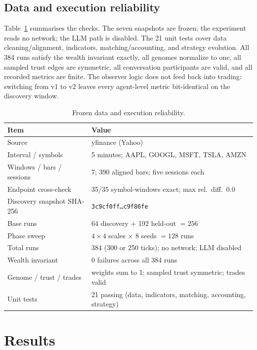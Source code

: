\documentclass[11pt]{article}
\begin{document}
\subsection{Data and execution reliability}

Table~\ref{tab:reliability} summarises the checks. The seven snapshots are
frozen; the experiment reads no network; the LLM path is disabled. The 21 unit
tests cover data cleaning/alignment, indicators, matching/accounting, and
strategy evolution. All 384 runs satisfy the wealth invariant exactly, all
genomes normalize to one, all sampled trust edges are symmetric, all conversation
participants are valid, and all recorded metrics are finite. The observer logic
does not feed back into trading: switching from v1 to v2 leaves every agent-level
metric bit-identical on the discovery window.

\begin{table}[t]
  \centering
  \small
  \caption{Frozen data and execution reliability.}
  \label{tab:reliability}
  \begin{tabular}{ll}
    \toprule
    Item & Value\\
    \midrule
    Source & yfinance (Yahoo)\\
    Interval / symbols & 5 minutes; AAPL, GOOGL, MSFT, TSLA, AMZN\\
    Windows / bars / sessions & 7; 390 aligned bars; five sessions each\\
    Endpoint cross-check & 35/35 symbol-windows exact; max rel.\ diff.\ $0.0$\\
    Discovery snapshot SHA-256 & \texttt{3c9cf0ff\ldots c9f86fe}\\
    Base runs & 64 discovery $+$ 192 held-out $=256$\\
    Phase sweep & $4\times4$ scales $\times$ 8 seeds $=128$ runs\\
    Total runs & 384 (300 or 250 ticks); no network; LLM disabled\\
    Wealth invariant & 0 failures across all 384 runs\\
    Genome / trust / trades & weights sum to 1; sampled trust symmetric; trades valid\\
    Unit tests & 21 passing (data, indicators, matching, accounting, strategy)\\
    \bottomrule
  \end{tabular}
\end{table}

\section{Results}
\end{document}
